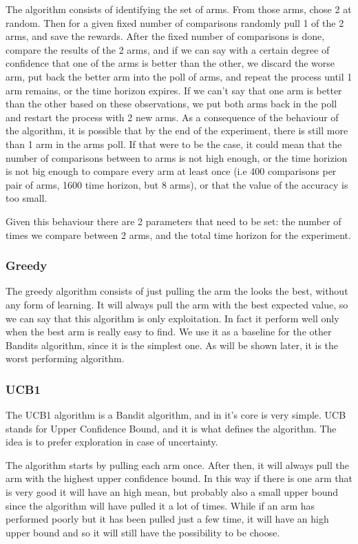The algorithm consists of identifying the set of arms. From those arms, chose 2 at random.
Then for a given fixed number of comparisons randomly pull 1 of the 2 arms, and save the rewards.
After the fixed number of comparisons is done, compare the results of the 2 arms, and if we can say with a certain
degree of confidence that one of the arms is better than the other, we discard the worse arm, put back the better arm
into the poll of arms, and repeat the process until 1 arm remains, or the time horizon expires.
If we can't say that one arm is better than the other based on these observations, we put both arms back in the poll and
restart the process with 2 new arms. As a consequence of the behaviour of the algorithm, it is possible that by the end of the
experiment, there is still more than 1 arm in the arms poll. If that were to be the case, it could mean that the number of
comparisons between to arms is not high enough, or the time horizion is not big enough to compare every arm at least once
(i.e 400 comparisons per pair of arms, 1600 time horizon, but 8 arms), or that the value of the accuracy is too small.

Given this behaviour there are 2 parameters that need to be set: the number of times we compare between 2 arms, and the
total time horizon for the experiment.



\subsubsection{Greedy}

The greedy algorithm consists of just pulling the arm the looks the best, without any form of learning.
It will always pull the arm with the best expected value, so we can say that this algorithm is only exploitation.
In fact it perform well only when the best arm is really easy to find. We use it as a baseline for the other Bandits algorithm,
since it is the simplest one. As will be shown later, it is the worst performing algorithm.


\subsubsection{UCB1}

The UCB1 algorithm is a Bandit algorithm, and in it's core is very simple. UCB stands for Upper Confidence Bound, and it is what
defines the algorithm. The idea is to prefer exploration in case of uncertainty.

The algorithm starts by pulling each arm once. After then, it will always pull the arm with the highest upper confidence bound.
In this way if there is one arm that is very good it will have an high mean, but probably also a small upper bound since the
algorithm will have pulled it a lot of times. While if an arm has performed poorly but it has been pulled just a few time,
it will have an high upper bound and so it will still have the possibility to be choose.

